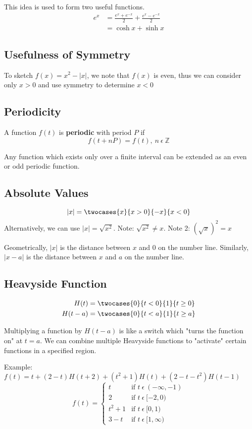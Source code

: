 \documentclass[12pt]{article}
\begin{document}
This idea is used to form two useful functions.
\begin{align*}
e^x &= \frac{e^x + e^{-x}}{2} + \frac{e^x-e^{-x}}{2}\\
&= \cosh{x} + \sinh{x}
\end{align*}

\subsection*{Usefulness of Symmetry}
To sketch $f(x) = x^2 - |x|$, we note that $f(x)$ is even, thus we can consider only $x > 0$ and use symmetry to determine $x < 0$

\subsection*{Periodicity}
A function $f(t)$ is {\bf periodic} with period $P$ if \[ f(t + nP) = f(t),\ n\ \epsilon\ \mathbb{Z} \]

Any function which exists only over a finite interval can be extended as an even or odd periodic function.

\subsection*{Absolute Values}
\[ |x| = \twocases{x}{x > 0}{-x}{x < 0} \]
Alternatively, we can use $|x| = \sqrt{x^2}$. Note: $\sqrt{x^2}\neq x$. Note 2: $(\sqrt{x})^2 = x$

Geometrically, $|x|$ is the distance between $x$ and $0$ on the number line. Similarly, $|x-a|$ is the distance between $x$ and $a$ on the number line.

\subsection*{Heavyside Function}
\begin{align*}
H(t) &= \twocases{0}{t < 0}{1}{t \geq 0}\\
H(t-a) &= \twocases{0}{t < a}{1}{t \geq a}
\end{align*}

Multiplying a function by $H(t-a)$ is like a switch which "turns the function on" at $t = a$. We can combine multiple Heavyside functions to "activate" certain functions in a specified region.

Example: $f(t) = t + (2-t)H(t+2) + (t^2+1)H(t) + (2-t-t^2)H(t-1)$
\[ f(t) =
   \begin{cases}
     t       & \text{if } t\ \epsilon\ (-\infty,-1)\\
     2       & \text{if } t\ \epsilon\ [-2,0)\\
     t^2 + 1 & \text{if } t\ \epsilon\ [0,1)\\
     3 - t   & \text{if } t\ \epsilon\ [1,\infty)
   \end{cases}
\]
\end{document}
